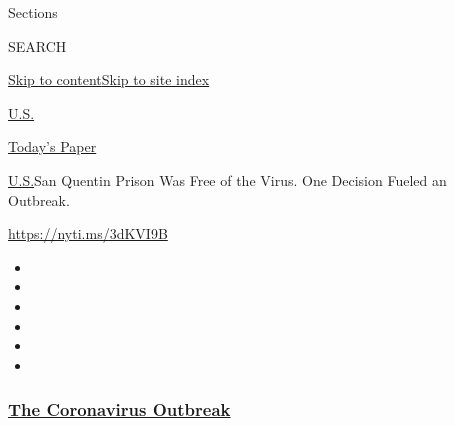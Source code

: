Sections

SEARCH

\protect\hyperlink{site-content}{Skip to
content}\protect\hyperlink{site-index}{Skip to site index}

\href{https://www.nytimes3xbfgragh.onion/section/us}{U.S.}

\href{https://myaccount.nytimes3xbfgragh.onion/auth/login?response_type=cookie\&client_id=vi}{}

\href{https://www.nytimes3xbfgragh.onion/section/todayspaper}{Today's
Paper}

\href{/section/us}{U.S.}\textbar{}San Quentin Prison Was Free of the
Virus. One Decision Fueled an Outbreak.

\url{https://nyti.ms/3dKVI9B}

\begin{itemize}
\item
\item
\item
\item
\item
\item
\end{itemize}

\hypertarget{the-coronavirus-outbreak}{%
\subsubsection{\texorpdfstring{\href{https://www.nytimes3xbfgragh.onion/news-event/coronavirus?name=styln-coronavirus-national\&region=TOP_BANNER\&block=storyline_menu_recirc\&action=click\&pgtype=Article\&impression_id=4b17b140-f4c5-11ea-ad1e-89255628ebac\&variant=undefined}{The
Coronavirus
Outbreak}}{The Coronavirus Outbreak}}\label{the-coronavirus-outbreak}}

